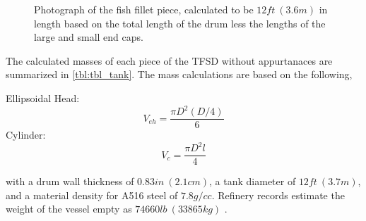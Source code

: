 \documentclass[10pt,parskip=half,
toc=sectionentrywithdots,
bibliography=totocnumbered,
captions=tableheading,numbers=noendperiod]{scrartcl}
\begin{document}
\begin{figure}[H]
\hypertarget{fig:fillet}{%
\begin{center}
\end{center}
\caption{Photograph of the fish fillet piece, calculated to be \(12ft\:(3.6m)\)
in length based on the total length of the drum less the lengths of the
large and small end caps.\cite{Malone2019a}}\label{fig:fillet}
}
\end{figure}

The calculated masses of each piece of the TFSD without appurtanaces are
summarized in \cref{tbl:tbl_tank}. The mass calculations are based on
the following,

Ellipsoidal Head:
\begin{equation}V_{eh}=\frac{\pi D^2 (D/4)}{6}\end{equation} Cylinder:
\begin{equation}V_c = \frac{\pi D^2 l}{4}\end{equation}

with a drum wall thickness of \(0.83in\:(2.1cm)\), a tank diameter of
\(12ft\:(3.7m)\), and a material density for A516 steel of \(7.8g/cc\).
Refinery records estimate the weight of the vessel empty as
\(74660lb\:(33865kg)\) \cite{Malone2019}.
\end{document}

